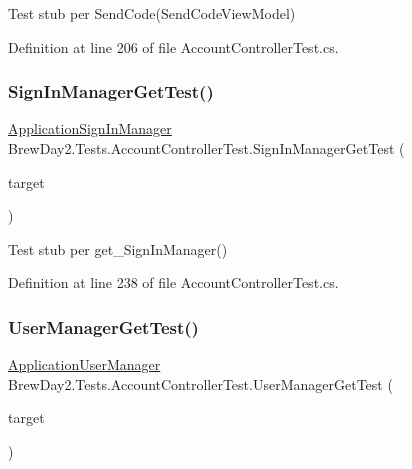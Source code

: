 Test stub per Send\+Code(\+Send\+Code\+View\+Model)



Definition at line 206 of file Account\+Controller\+Test.\+cs.

\mbox{\label{class_brew_day2_1_1_tests_1_1_account_controller_test_a1d7b298a4ff46ae60c23f324d5a10e31}} 
\subsubsection{\texorpdfstring{Sign\+In\+Manager\+Get\+Test()}{SignInManagerGetTest()}}
{\footnotesize\ttfamily \mbox{\hyperlink{class_brew_day2_1_1_application_sign_in_manager}{Application\+Sign\+In\+Manager}} Brew\+Day2.\+Tests.\+Account\+Controller\+Test.\+Sign\+In\+Manager\+Get\+Test (\begin{DoxyParamCaption}\item[{\mbox{[}\+Pex\+Assume\+Under\+Test\mbox{]} \mbox{\hyperlink{class_brew_day2_1_1_controllers_1_1_account_controller}{Account\+Controller}}}]{target }\end{DoxyParamCaption})}



Test stub per get\+\_\+\+Sign\+In\+Manager()



Definition at line 238 of file Account\+Controller\+Test.\+cs.

\mbox{\label{class_brew_day2_1_1_tests_1_1_account_controller_test_ab5f9b6689f2f048ab2e6b83030e99c73}} 
\subsubsection{\texorpdfstring{User\+Manager\+Get\+Test()}{UserManagerGetTest()}}
{\footnotesize\ttfamily \mbox{\hyperlink{class_brew_day2_1_1_application_user_manager}{Application\+User\+Manager}} Brew\+Day2.\+Tests.\+Account\+Controller\+Test.\+User\+Manager\+Get\+Test (\begin{DoxyParamCaption}\item[{\mbox{[}\+Pex\+Assume\+Under\+Test\mbox{]} \mbox{\hyperlink{class_brew_day2_1_1_controllers_1_1_account_controller}{Account\+Controller}}}]{target }\end{DoxyParamCaption})}



